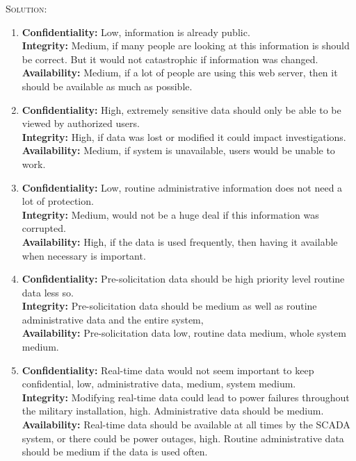 \documentclass[12pt]{article}
\newenvironment{solution}
    {\textsc{Solution:}\\}
    {\newpage}%
\begin{document}
	\begin{solution}
		\begin{enumerate}[label=\alph*]
			\item \textbf{Confidentiality:} Low, information is already public.\\
				\textbf{Integrity:} Medium, if many people are looking at this
				information is should be correct. But it would not catastrophic if
				information was changed.\\
				\textbf{Availability:} Medium, if a lot of people are using this
				web server, then it should be available as much as possible.
			\item \textbf{Confidentiality:} High, extremely sensitive data should
				only be able to be viewed by authorized users.\\
				\textbf{Integrity:} High, if data was lost or modified it could
				impact investigations.\\
				\textbf{Availability:} Medium, if system is unavailable, users
				would be unable to work.
			\item \textbf{Confidentiality:} Low, routine administrative information
				does not need a lot of protection.\\
				\textbf{Integrity:} Medium, would not be a huge deal if this information
				was corrupted.\\
				\textbf{Availability:} High, if the data is used frequently, then
				having it available when necessary is important.
			\item \textbf{Confidentiality:} Pre-solicitation data should be high priority level
				routine data less so.\\
				\textbf{Integrity:} Pre-solicitation data should be medium as well
				as routine administrative data and the entire system,\\
				\textbf{Availability:} Pre-solicitation data low, routine data medium,
				whole system medium.
			\item \textbf{Confidentiality:} Real-time data would not seem important to
				keep confidential, low, administrative data, medium, system medium.\\
				\textbf{Integrity:} Modifying real-time data could lead to power failures
				throughout the military installation, high. Administrative data
				should be medium.\\
				\textbf{Availability:} Real-time data should be available at all times
				by the SCADA system, or there could be power outages, high.
				Routine administrative data should be medium if the data is used
				often.
		\end{enumerate}
	\end{solution}
\end{document}
